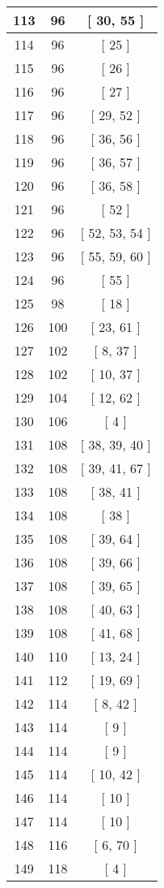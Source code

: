 \begin{center}
\begin{longtable}[H]{|| c c c ||}
113 & 96 & [ 30, 55 ]
\\\hline
114 & 96 & [ 25 ]
\\\hline
115 & 96 & [ 26 ]
\\\hline
116 & 96 & [ 27 ]
\\\hline
117 & 96 & [ 29, 52 ]
\\\hline
118 & 96 & [ 36, 56 ]
\\\hline
119 & 96 & [ 36, 57 ]
\\\hline
120 & 96 & [ 36, 58 ]
\\\hline
121 & 96 & [ 52 ]
\\\hline
122 & 96 & [ 52, 53, 54 ]
\\\hline
123 & 96 & [ 55, 59, 60 ]
\\\hline
124 & 96 & [ 55 ]
\\\hline
125 & 98 & [ 18 ]
\\\hline
126 & 100 & [ 23, 61 ]
\\\hline
127 & 102 & [ 8, 37 ]
\\\hline
128 & 102 & [ 10, 37 ]
\\\hline
129 & 104 & [ 12, 62 ]
\\\hline
130 & 106 & [ 4 ]
\\\hline
131 & 108 & [ 38, 39, 40 ]
\\\hline
132 & 108 & [ 39, 41, 67 ]
\\\hline
133 & 108 & [ 38, 41 ]
\\\hline
134 & 108 & [ 38 ]
\\\hline
135 & 108 & [ 39, 64 ]
\\\hline
136 & 108 & [ 39, 66 ]
\\\hline
137 & 108 & [ 39, 65 ]
\\\hline
138 & 108 & [ 40, 63 ]
\\\hline
139 & 108 & [ 41, 68 ]
\\\hline
140 & 110 & [ 13, 24 ]
\\\hline
141 & 112 & [ 19, 69 ]
\\\hline
142 & 114 & [ 8, 42 ]
\\\hline
143 & 114 & [ 9 ]
\\\hline
144 & 114 & [ 9 ]
\\\hline
145 & 114 & [ 10, 42 ]
\\\hline
146 & 114 & [ 10 ]
\\\hline
147 & 114 & [ 10 ]
\\\hline
148 & 116 & [ 6, 70 ]
\\\hline
149 & 118 & [ 4 ]
\\\hline

\end{longtable}
\end{center}
